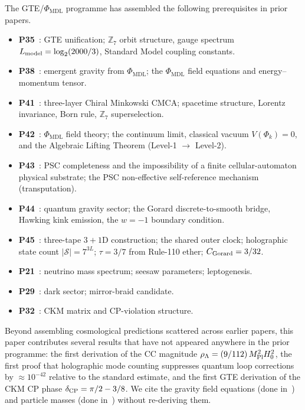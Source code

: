 \documentclass[11pt]{article}
\theoremstyle{remark}
\newcommand{\PHIMDL}{\Phi_{\mathrm{MDL}}}
\newcommand{\ZS}{\mathbb{Z}_7}
\newcommand{\MPl}{M_{\rm Pl}}
\newcommand{\Hnought}{H_0}
\newcommand{\Lmodel}{L_{\rm model}}
\newcommand{\CMCA}{\text{CMCA}}
\newcommand{\CGorard}{C_{\rm Gorard}}
\begin{document}
The GTE/$\PHIMDL$ programme has assembled the following prerequisites in prior
papers.

\begin{itemize}[noitemsep,topsep=2pt]
\item \textbf{P35}~\cite{SpivackGTEUnification}: GTE unification; $\ZS$ orbit
      structure, gauge spectrum $\Lmodel = \log_2(2000/3)$, Standard Model
      coupling constants.
\item \textbf{P38}~\cite{SpivackPhiMDLGravity}: emergent gravity from
      $\PHIMDL$; the $\PHIMDL$ field equations and energy--momentum tensor.
\item \textbf{P41}~\cite{SpivackCMCA}: three-layer Chiral Minkowski $\CMCA$;
      spacetime structure, Lorentz invariance, Born rule, $\ZS$ superselection.
\item \textbf{P42}~\cite{SpivackPhiMDLField}: $\PHIMDL$ field theory; the
      continuum limit, classical vacuum $V(\Phi_k)=0$, and the Algebraic
      Lifting Theorem (Level-1 $\to$ Level-2).
\item \textbf{P43}~\cite{SpivackCompleteness}: PSC completeness and the
      impossibility of a finite cellular-automaton physical substrate;
      the PSC non-effective self-reference mechanism (transputation).
\item \textbf{P44}~\cite{SpivackQGR}: quantum gravity sector; the Gorard
      discrete-to-smooth bridge, Hawking kink emission, the $w=-1$ boundary
      condition.
\item \textbf{P45}~\cite{SpivackThreeTapeCMCA}: three-tape $3{+}1$D
      construction; the shared outer clock; holographic state count
      $|\mathcal{S}|=7^{3L}$; $\tau=3/7$ from Rule-110 ether;
      $\CGorard = 3/32$.
\item \textbf{P21}~\cite{SpivackNeutrino}: neutrino mass spectrum; seesaw
      parameters; leptogenesis.
\item \textbf{P29}~\cite{SpivackMirrorBraidAtlas}: dark sector; mirror-braid
      candidate.
\item \textbf{P32}~\cite{SpivackCKM}: CKM matrix and CP-violation structure.
\end{itemize}

Beyond assembling cosmological predictions scattered across earlier papers,
this paper contributes several results that have not appeared anywhere in the
prior programme: the first derivation of the CC magnitude
$\rho_\Lambda = (9/112)\,\MPl^2\Hnought^2$, the first proof that holographic
mode counting suppresses quantum loop corrections by $\approx 10^{-42}$
relative to the standard estimate, and the first GTE derivation of the
CKM CP phase $\delta_{\rm CP} = \pi/2 - 3/8$.
We cite the gravity field equations
(done in~\cite{SpivackPhiMDLGravity,SpivackQGR}) and particle masses
(done in~\cite{SpivackGTEUnification}) without re-deriving them.
\end{document}
